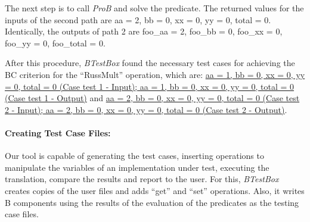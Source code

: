 \documentclass[runningheads]{llncs}
\begin{document}
The next step is to call \textit{ProB} and solve the predicate. The returned values for the inputs of the second path are aa = 2, bb = 0, xx = 0, yy = 0, total = 0. Identically, the outputs of path 2 are foo\_aa = 2, foo\_bb = 0, foo\_xx = 0, foo\_yy = 0, foo\_total = 0.

After this procedure, \textit{BTestBox} found the necessary test cases for achieving the BC criterion for the ``RussMult'' operation, which are: \ul{aa = 1, bb = 0, xx = 0, yy = 0, total = 0 (Case test 1 - Input);  aa = 1, bb = 0, xx = 0, yy = 0, total = 0 (Case test 1 - Output)} and \ul{aa = 2, bb = 0, xx = 0, yy = 0, total = 0 (Case test 2 - Input);  aa = 2, bb = 0, xx = 0, yy = 0, total = 0 (Case test 2 - Output)}. 

\paragraph{Creating Test Case Files:} Our tool is capable of generating the test cases, inserting operations to manipulate the variables of an implementation under test, executing the translation, compare the results and report to the user. For this, \textit{BTestBox} creates copies of the user files and adds ``get'' and ``set'' operations. Also, it writes B components using the results of the evaluation of the predicates as the testing case files.
\end{document}
